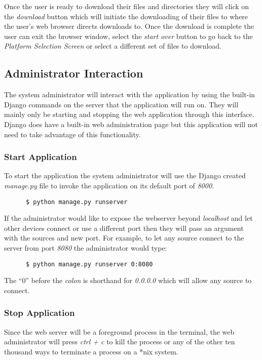 \documentclass{article}
\begin{document}
      Once the user is ready to download their files and directories they will click on the \textit{download} button which will
      initiate the downloading of their files to where the user's web browser directs downloads to. Once the download is complete
      the user can exit the browser window, select the \textit{start over} button to go back to the \textit{Platform Selection Screen}
      or select a different set of files to download.
    
    \subsection{Administrator Interaction}
    The system administrator will interact with the application by using the built-in Django commands on the
    server that the application will run on. They will mainly only be starting and stopping the web application
    through this interface. Django does have a built-in web administration page but this application will not
    need to take advantage of this functionality.

      \subsubsection{Start Application}
      To start the application the system administrator will use the Django created \textit{manage.py} file
      to invoke the application on its default port of \textit{8000}.
      \begin{verbatim}
      $ python manage.py runserver
      \end{verbatim}

      If the administrator would like to expose the webserver beyond \textit{localhost} and let other devices connect or
      use a different port then they will pass an argument with the sources and new port. For example, to let any source
      connect to the server from port \textit{8080} the administrator would type:
      \begin{verbatim}
      $ python manage.py runserver 0:8080
      \end{verbatim}
      The ``0'' before the \textit{colon} is shorthand for \textit{0.0.0.0} which will allow any source to connect.

      \subsubsection{Stop Application}
      Since the web server will be a foreground process in the terminal, the web administrator will press \textit{ctrl + c}
      to kill the process or any of the other ten thousand ways to terminate a process on a *nix system.
\end{document}
